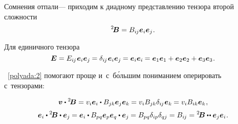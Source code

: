 \begin{otherlanguage}{russian}

Сомнения отпали\:--- приходим к диадному представлению тензора второй сложности
\begin{equation}\label{polyada:2}
^2\!\bm{B} = B_{i\hspace{-0.1ex}j} \bm{e}_i \bm{e}_j \hspace{.1ex} .
\end{equation}

\vspace{-0.2em} Для единичного тензора
\[ \bm{E} =
E_{i\hspace{-0.1ex}j} \hspace{.16ex} \bm{e}_i \bm{e}_j \hspace{-0.1ex} =
\delta_{i\hspace{-0.1ex}j} \hspace{.16ex} \bm{e}_i \bm{e}_j \hspace{-0.1ex} =
\bm{e}_i \bm{e}_i \hspace{-0.1ex} =
\bm{e}_1 \bm{e}_1 + \bm{e}_2 \bm{e}_2 + \bm{e}_3 \bm{e}_3
\hspace{.1ex} . \]

~\eqref{polyada:2} помогают проще и~с~б\'{о}льшим пониманием оперировать с~тензорами:

\nopagebreak\vspace{-0.1em}\begin{equation*}
\bm{v} \dotp {^2\!\bm{B}} =
v_i\bm{e}_i \dotp B_{jk}\bm{e}_j\bm{e}_k \hspace{-0.1ex} =
v_i B_{jk} \delta_{i\hspace{-0.1ex}j} \hspace{.1ex} \bm{e}_k \hspace{-0.1ex} =
v_i B_{ik} \bm{e}_k \hspace{.1ex} ,
\end{equation*}\vspace{-1.25em}
\begin{equation}\label{tensorcomponents}
\bm{e}_i \dotp {^2\!\bm{B}} \dotp \bm{e}_j \hspace{-0.1ex} =
\bm{e}_i \dotp B_{pq}\bm{e}_p\bm{e}_q \dotp \bm{e}_j \hspace{-0.1ex} =
B_{pq} \delta_{ip} \delta_{qj} =
B_{i\hspace{-0.1ex}j} =
{^2\!\bm{B}} \dotdotp \bm{e}_j \bm{e}_i \hspace{.1ex} .
\end{equation}


\end{otherlanguage}

